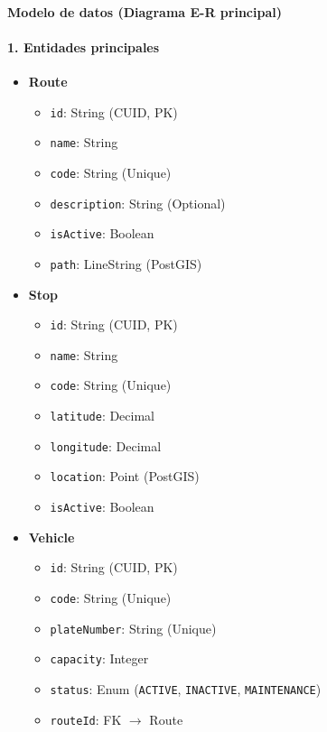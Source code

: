 \paragraph{Modelo de datos (Diagrama E-R principal)}

\paragraph{1. Entidades principales}
\begin{itemize}
    \item \textbf{Route}
    \begin{itemize}
        \item \texttt{id}: String (CUID, PK)
        \item \texttt{name}: String
        \item \texttt{code}: String (Unique)
        \item \texttt{description}: String (Optional)
        \item \texttt{isActive}: Boolean
        \item \texttt{path}: LineString (PostGIS)
    \end{itemize}
    \item \textbf{Stop}
    \begin{itemize}
        \item \texttt{id}: String (CUID, PK)
        \item \texttt{name}: String
        \item \texttt{code}: String (Unique)
        \item \texttt{latitude}: Decimal
        \item \texttt{longitude}: Decimal
        \item \texttt{location}: Point (PostGIS)
        \item \texttt{isActive}: Boolean
    \end{itemize}
    \item \textbf{Vehicle}
    \begin{itemize}
        \item \texttt{id}: String (CUID, PK)
        \item \texttt{code}: String (Unique)
        \item \texttt{plateNumber}: String (Unique)
        \item \texttt{capacity}: Integer
        \item \texttt{status}: Enum (\texttt{ACTIVE}, \texttt{INACTIVE}, \texttt{MAINTENANCE})
        \item \texttt{routeId}: FK $\rightarrow$ Route
    \end{itemize}
\end{itemize}

